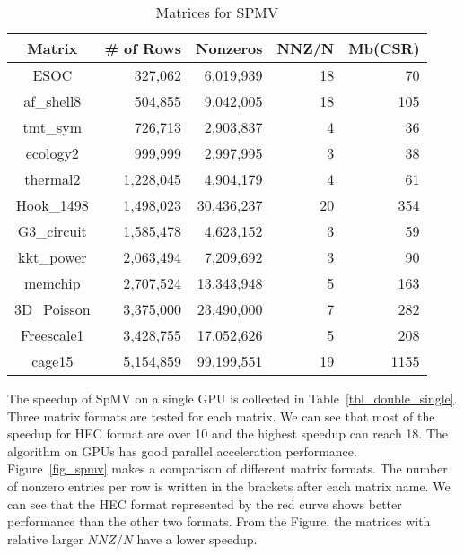 \documentclass[runningheads,a4paper]{llncs}
\begin{document}
{\begin{table}[!htb]
\centering
\caption{Matrices for SPMV}
\begin{tabular}{|c|r|r|r|r|} \hline
\bfseries Matrix    & \bfseries \# of Rows  & \bfseries Nonzeros    & \bfseries NNZ/N & \bfseries  Mb(CSR)\\ \hline
ESOC	           & 327,062	    &6,019,939	&18	       &70\\ \hline
af\_shell8	       & 504,855	    &9,042,005	&18	       &105\\ \hline
tmt\_sym	       & 726,713	    &2,903,837	&4	       &36\\ \hline
ecology2	       & 999,999	    &2,997,995	&3	       &38\\ \hline
thermal2	       & 1,228,045	    &4,904,179	&4	       &61\\ \hline
Hook\_1498	       & 1,498,023	    &30,436,237	&20	       &354\\ \hline
G3\_circuit	       & 1,585,478	    &4,623,152	&3	       &59\\ \hline
kkt\_power	       & 2,063,494	    &7,209,692	&3	       &90\\ \hline
memchip	           & 2,707,524	    &13,343,948	&5	       &163\\ \hline
3D\_Poisson	       & 3,375,000	    &23,490,000	&7	       &282\\ \hline
Freescale1	       & 3,428,755	    &17,052,626	&5	       &208\\ \hline
cage15	           & 5,154,859	    &99,199,551	&19	       &1155\\ \hline
\end{tabular}
\label{tbl_spmv_matrix}
\end{table}

The speedup of SpMV on a single GPU is collected in Table~\ref{tbl_double_single}. Three matrix formats are tested for each matrix. We can see that most of the speedup for HEC format are over 10 and the highest speedup can reach 18. The algorithm on GPUs has good parallel acceleration performance. Figure~\ref{fig_spmv} makes a comparison of different matrix formats. The number of nonzero entries per row is written in the brackets after each matrix name. We can see that the HEC format represented by the red curve shows better performance than the other two formats. From the Figure, the matrices with relative larger $NNZ/N$ have a lower speedup.

}
\end{document}
